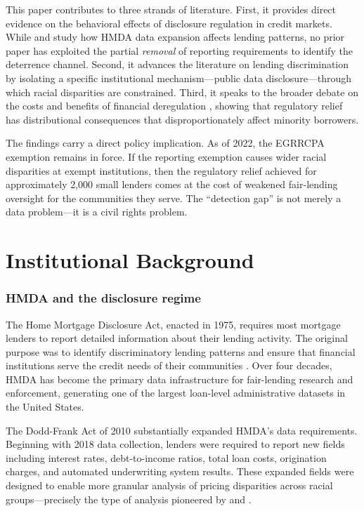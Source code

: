 \documentclass[12pt]{article}
\begin{document}
This paper contributes to three strands of literature. First, it provides direct evidence on the behavioral effects of disclosure regulation in credit markets. While \citet{ambrose2021real} and \citet{agarwal2016monthly} study how HMDA data expansion affects lending patterns, no prior paper has exploited the partial \textit{removal} of reporting requirements to identify the deterrence channel. Second, it advances the literature on lending discrimination \citep{bartlett2022consumer, fuster2022predictably, hanson2016discrimination} by isolating a specific institutional mechanism---public data disclosure---through which racial disparities are constrained. Third, it speaks to the broader debate on the costs and benefits of financial deregulation \citep{agarwal2014inconsistent, dahl2012impact}, showing that regulatory relief has distributional consequences that disproportionately affect minority borrowers.

The findings carry a direct policy implication. As of 2022, the EGRRCPA exemption remains in force. If the reporting exemption causes wider racial disparities at exempt institutions, then the regulatory relief achieved for approximately 2,000 small lenders comes at the cost of weakened fair-lending oversight for the communities they serve. The ``detection gap'' is not merely a data problem---it is a civil rights problem.

\section{Institutional Background}

\subsubsection*{HMDA and the disclosure regime} The Home Mortgage Disclosure Act, enacted in 1975, requires most mortgage lenders to report detailed information about their lending activity. The original purpose was to identify discriminatory lending patterns and ensure that financial institutions serve the credit needs of their communities \citep{avery2007opportunities}. Over four decades, HMDA has become the primary data infrastructure for fair-lending research and enforcement, generating one of the largest loan-level administrative datasets in the United States.

The Dodd-Frank Act of 2010 substantially expanded HMDA's data requirements. Beginning with 2018 data collection, lenders were required to report new fields including interest rates, debt-to-income ratios, total loan costs, origination charges, and automated underwriting system results. These expanded fields were designed to enable more granular analysis of pricing disparities across racial groups---precisely the type of analysis pioneered by \citet{bartlett2022consumer} and \citet{bhutta2022racial}.
\end{document}
